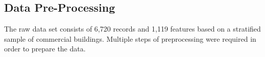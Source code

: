 \subsection{Data Pre-Processing}

The raw data set consists of 6,720 records and 1,119 features based on a stratified sample of commercial buildings.  Multiple steps of preprocessing were required in order to prepare the data.